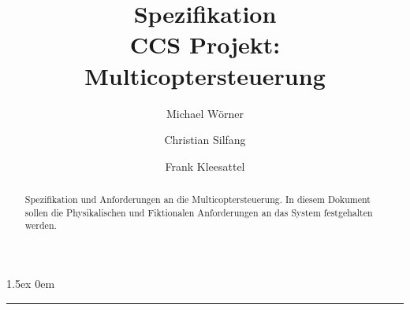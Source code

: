 \documentclass[a4paper,12pt]{article}
\begin{document}
\title{
\textbf{Spezifikation}\\
CCS Projekt: Multicoptersteuerung}
\author{Michael Wörner \and Christian Silfang \and Frank Kleesattel}
\date{}

\parskip1.5ex
\parindent0em

\maketitle

\begin{abstract}
Spezifikation und Anforderungen an die \glqq Multicoptersteuerung\grqq. In diesem Dokument sollen die
Physikalischen und Fiktionalen Anforderungen an das System festgehalten werden. 
\end{abstract}


\noindent\rule[1ex]{\textwidth}{1pt}
\tableofcontents
\newpage


\end{document}
